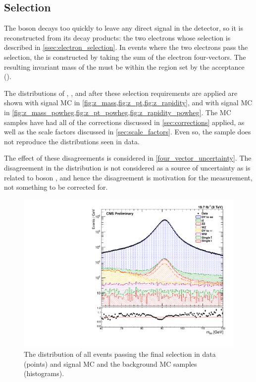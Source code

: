 \subsection{\Z Selection}

The \Z boson decays too quickly to leave any direct signal in the detector, so
it is reconstructed from its decay products: the two electrons whose selection
is described in \cref{ssec:electron_selection}. In events where the two
electrons pass the selection, the \Z is constructed by taking the sum of the
electron four-vectors. The resulting invariant mass of the \Z must be within
the region set by the acceptance (\MassRange).

The distributions of \mee, \Z \bosonpt, and \Z \rapidity after these selection
requirements are applied are shown with \MADGRAPH signal MC in
\cref{fig:z_mass,fig:z_pt,fig:z_rapidity}, and with \POWHEG signal MC in
\cref{fig:z_mass_powheg,fig:z_pt_powheg,fig:z_rapidity_powheg}. The MC samples
have had all of the corrections discussed in \cref{sec:corrections} applied, as
well as the scale factors discussed in \cref{sec:scale_factors}. Even so, the
\MADGRAPH sample does not reproduce the distributions seen in data.

The effect of these disagreements is considered in
\cref{four_vector_uncertainty}. The disagreement in the \Z \bosonpt
distribution is not considered as a source of uncertainty as \phistar is
related to boson \bosonpt, and hence the disagreement is motivation for the
measurement, not something to be corrected for.

\begin{figure}[!htbp]
    \centering
    \includegraphics[width=\textwidth]{figures/z_mass_fine.pdf}
    \caption[
        The \mee distribution of events in data and MC with \MADGRAPH signal MC.
    ]{
        The \mee distribution of all events passing the final selection in data
        (points) and \MADGRAPH signal MC and the background MC samples
        (histograms).
    }
    \label{fig:z_mass}
\end{figure}

